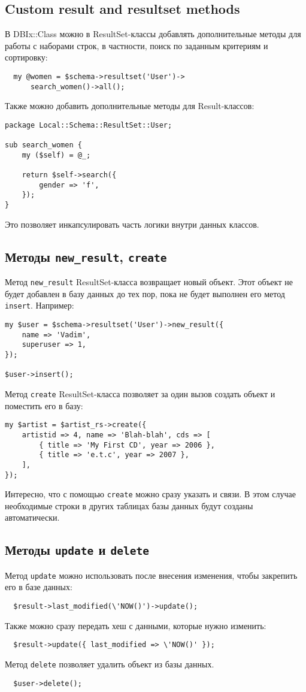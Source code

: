 \subsection{Custom result and resultset methods}
В DBIx::Class можно в ResultSet-классы добавлять дополнительные методы для работы с наборами строк, в частности, поиск по заданным критериям и сортировку:
\begin{verbatim}
  my @women = $schema->resultset('User')->
      search_women()->all();
\end{verbatim}
Также можно добавить дополнительные методы для Result-классов:
\begin{verbatim}
package Local::Schema::ResultSet::User;

sub search_women {
    my ($self) = @_;

    return $self->search({
        gender => 'f',
    });
}
\end{verbatim}
Это позволяет инкапсулировать часть логики внутри данных классов.

\subsection{Методы \texttt{new\_result}, \texttt{create}}
Метод \verb|new_result| ResultSet-класса возвращает новый объект. Этот объект не будет добавлен в базу данных до тех пор, пока не будет выполнен его метод \verb|insert|. Например:
\begin{verbatim}
my $user = $schema->resultset('User')->new_result({
    name => 'Vadim',
    superuser => 1,
});

$user->insert();
\end{verbatim}

Метод \verb|create| ResultSet-класса позволяет за один вызов создать объект и поместить его в базу:
\begin{verbatim}
my $artist = $artist_rs->create({
    artistid => 4, name => 'Blah-blah', cds => [
        { title => 'My First CD', year => 2006 },
        { title => 'e.t.c', year => 2007 },
    ],
});
\end{verbatim}
Интересно, что с помощью \verb|create| можно сразу указать и связи. В этом случае необходимые строки в других таблицах базы данных будут созданы автоматически.

\subsection{Методы \texttt{update} и \texttt{delete}}
Метод \verb|update| можно использовать после внесения изменения, чтобы закрепить его в базе данных:
\begin{verbatim}
  $result->last_modified(\'NOW()')->update();
\end{verbatim}
Также можно сразу передать хеш с данными, которые нужно изменить:
\begin{verbatim}
  $result->update({ last_modified => \'NOW()' });
\end{verbatim}
Метод \verb|delete| позволяет удалить объект из базы данных.
\begin{verbatim}
  $user->delete();
\end{verbatim}


